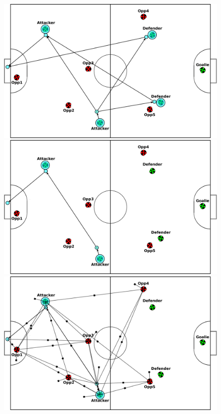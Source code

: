 \documentclass[a4paper, 10pt, conference]{ieeeconf}      %
\begin{document}
\begin{figure}[ht!]
\begin{center}
\includegraphics[totalheight=1.0in]{plan2_resized}
\includegraphics[totalheight=1.0in]{plan3_resized}
\includegraphics[totalheight=1.0in]{plan5_resized}

\end{center}
\end{figure}
\end{document}
